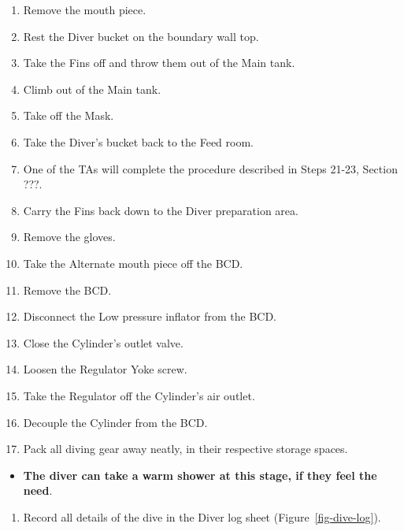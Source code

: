 \documentclass[
  12pt,
]{report}
\providecommand{\tightlist}{%
  \setlength{\itemsep}{0pt}\setlength{\parskip}{0pt}}\usepackage{longtable,booktabs,array}
\begin{document}
\begin{enumerate}
\def\labelenumi{\arabic{enumi}.}
\setcounter{enumi}{29}
\tightlist
\item
  Remove the mouth piece.
\item
  Rest the Diver bucket on the boundary wall top.
\item
  Take the Fins off and throw them out of the Main tank.
\item
  Climb out of the Main tank.
\item
  Take off the Mask.
\item
  Take the Diver's bucket back to the Feed room.
\item
  One of the TAs will complete the procedure described in Steps 21-23,
  Section ???.
\item
  Carry the Fins back down to the Diver preparation area.
\item
  Remove the gloves.
\item
  Take the Alternate mouth piece off the BCD.
\item
  Remove the BCD.
\item
  Disconnect the Low pressure inflator from the BCD.
\item
  Close the Cylinder's outlet valve.
\item
  Loosen the Regulator Yoke screw.
\item
  Take the Regulator off the Cylinder's air outlet.
\item
  Decouple the Cylinder from the BCD.
\item
  Pack all diving gear away neatly, in their respective storage spaces.
\end{enumerate}

\begin{itemize}
\tightlist
\item
  \textbf{The diver can take a warm shower at this stage, if they feel
  the need}.
\end{itemize}

\begin{enumerate}
\def\labelenumi{\arabic{enumi}.}
\setcounter{enumi}{45}
\tightlist
\item
  Record all details of the dive in the Diver log sheet
  (Figure~\ref{fig-dive-log}).
\end{enumerate}
\end{document}
